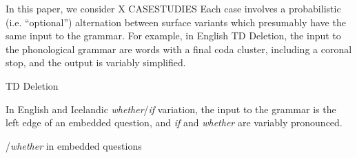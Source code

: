 In this paper, we consider X CASESTUDIES
Each case involves a probabilistic (i.e. ``optional'') alternation between surface variants which presumably have the same input to the grammar.
For example, in English TD Deletion, the input to the phonological grammar are words with a final coda cluster, including a coronal stop, and the output is variably simplified.
\begin{exe}
	\ex TD Deletion\\
\end{exe}

In English and Icelandic {\it whether}/{\it if} variation, the input to the grammar is the left edge of an embedded question, and {\it if} and {\it whether} are variably pronounced.
\begin{exe}
/{\it whether} in embedded questions\\
\end{exe}


